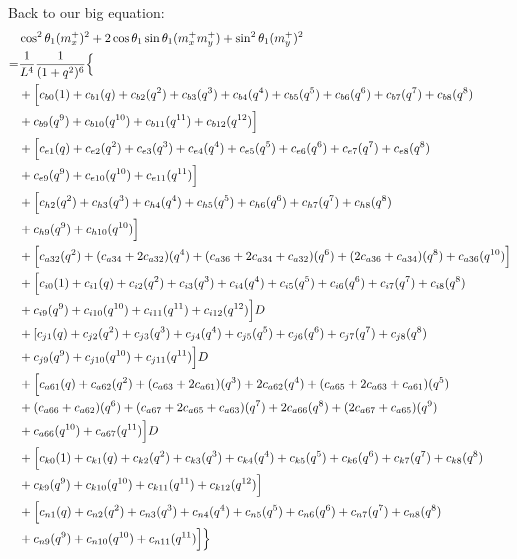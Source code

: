 \documentclass[12pt]{article}
\begin{document}
Back to our big equation:
\begin{align}
    &\cos^2\theta_1(m_x^+)^2  + 2\cos\theta_1\sin\theta_1(m_x^+m_y^+)  +\sin^2\theta_1(m_y^+)^2 \\
    =& \frac{1}{L^4} \frac{1}{(1+q^2)^6} \Bigl\{ \nonumber\\
    &+ \Bigl[ c_{b0}(1)  + c_{b1}(q) + c_{b2}(q^2) + c_{b3}(q^3) + c_{b4}(q^4) + c_{b5}(q^5) + c_{b6}(q^6) + c_{b7}(q^7) + c_{b8}(q^8) \nonumber\\
    &+ c_{b9}(q^9) + c_{b10}(q^{10}) + c_{b11}(q^{11}) + c_{b12}(q^{12})  \Bigr] \nonumber\\
    &+ \Bigl[ c_{e1}(q) + c_{e2}(q^2) + c_{e3}(q^3) + c_{e4}(q^4) + c_{e5}(q^5) + c_{e6}(q^6) + c_{e7}(q^7) + c_{e8}(q^8) \nonumber\\
    &+ c_{e9}(q^9) + c_{e10}(q^{10}) + c_{e11}(q^{11}) \Bigr] \nonumber\\
    &+ \Bigl[ c_{h2}(q^2) + c_{h3}(q^3) + c_{h4}(q^4) + c_{h5}(q^5) + c_{h6}(q^6) + c_{h7}(q^7) + c_{h8}(q^8) \nonumber\\
    &+ c_{h9}(q^9) + c_{h10}(q^{10}) \Bigr] \nonumber\\
    &+ \Bigl[ c_{a32}(q^2) + (c_{a34} + 2c_{a32})(q^4) + (c_{a36} + 2c_{a34}+ c_{a32})(q^6) + (2c_{a36} + c_{a34})(q^8) +  c_{a36}(q^{10}) \Bigr]\nonumber\\
    &+ \Bigl[ c_{i0}(1) + c_{i1}(q) + c_{i2}(q^2) + c_{i3}(q^3) + c_{i4}(q^4) + c_{i5}(q^5) + c_{i6}(q^6) + c_{i7}(q^7) + c_{i8}(q^8) \nonumber\\
    &+ c_{i9}(q^9) + c_{i10}(q^{10}) + c_{i11}(q^{11}) + c_{i12}(q^{12}) \Bigr]D \nonumber\\
    &+ [ c_{j1}(q) + c_{j2}(q^2) + c_{j3}(q^3) + c_{j4}(q^4) + c_{j5}(q^5) + c_{j6}(q^6) + c_{j7}(q^7) + c_{j8}(q^8) \nonumber\\
    &+ c_{j9}(q^9) + c_{j10}(q^{10}) + c_{j11}(q^{11}) \Bigr]D \nonumber\\
    &+ \Bigl[  c_{a61}(q)  + c_{a62}(q^2) +  (c_{a63} + 2c_{a61})(q^3) + 2c_{a62}(q^4) +(c_{a65} + 2c_{a63} + c_{a61})(q^5) \nonumber\\
    &+ (c_{a66} + c_{a62})(q^6) +(c_{a67} + 2c_{a65} + c_{a63})(q^7) +  2c_{a66}(q^8) +(2c_{a67} + c_{a65})(q^9) \nonumber\\
    &+  c_{a66}(q^{10}) +c_{a67}(q^{11})  \Bigr]D \nonumber\\
    &+ \Bigl[ c_{k0}(1) + c_{k1}(q) + c_{k2}(q^2) + c_{k3}(q^3) + c_{k4}(q^4) + c_{k5}(q^5) + c_{k6}(q^6) + c_{k7}(q^7) + c_{k8}(q^8) \nonumber\\
    &+ c_{k9}(q^9) + c_{k10}(q^{10}) + c_{k11}(q^{11}) + c_{k12}(q^{12})\Bigr] \nonumber\\
    &+ \Bigl[ c_{n1}(q) + c_{n2}(q^2) + c_{n3}(q^3) + c_{n4}(q^4) + c_{n5}(q^5) + c_{n6}(q^6) + c_{n7}(q^7) + c_{n8}(q^8) \nonumber\\
    &+ c_{n9}(q^9) + c_{n10}(q^{10}) + c_{n11}(q^{11}) \Bigr] \Bigr\}
\end{align}
\end{document}
